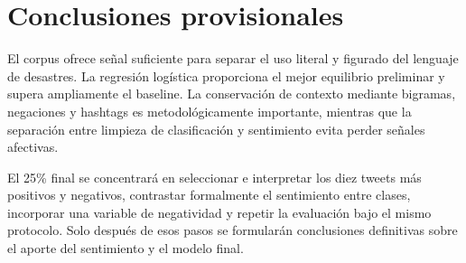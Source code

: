 \documentclass[11pt,letterpaper]{article}
\begin{document}
\section{Conclusiones provisionales}

El corpus ofrece señal suficiente para separar el uso literal y figurado del lenguaje de desastres. La regresión logística proporciona el mejor equilibrio preliminar y supera ampliamente el baseline. La conservación de contexto mediante bigramas, negaciones y hashtags es metodológicamente importante, mientras que la separación entre limpieza de clasificación y sentimiento evita perder señales afectivas.

El 25\% final se concentrará en seleccionar e interpretar los diez tweets más positivos y negativos, contrastar formalmente el sentimiento entre clases, incorporar una variable de negatividad y repetir la evaluación bajo el mismo protocolo. Solo después de esos pasos se formularán conclusiones definitivas sobre el aporte del sentimiento y el modelo final.
\end{document}
